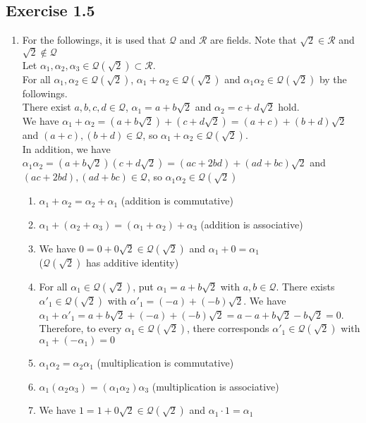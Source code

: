 \documentclass{article}
\newcommand\Q{\mathcal Q}
\newcommand\R{\mathcal R}
\begin{document}
\subsection{Exercise 1.5} 
\begin{enumerate}[label = (\alph*)]
\item
For the followings, it is used that $\Q$ and $\R$ are fields. Note that $\sqrt2 \in \R$ and $\sqrt2 \not\in \Q$\\
Let $\alpha_1, \alpha_2, \alpha_3 \in \Q(\sqrt2) \subset \R$.\\
For all $\alpha_1, \alpha_2 \in \Q(\sqrt2)$, $\alpha_1 + \alpha_2 \in \Q(\sqrt2)$ and $\alpha_1\alpha_2 \in \Q(\sqrt2)$ by the followings.\\
There exist $a,b,c,d \in \Q$, $\alpha_1 = a + b\sqrt2$ and $\alpha_2 = c + d\sqrt2$ hold.\\
We have $\alpha_1 + \alpha_2 = (a + b\sqrt2) + (c + d\sqrt2) = (a + c) + (b + d)\sqrt2$ and $(a + c),(b + d) \in \Q$, so $\alpha_1 + \alpha_2 \in \Q(\sqrt2)$.\\
In addition, we have $\alpha_1\alpha_2 = (a + b\sqrt2)(c + d\sqrt2) = (ac + 2bd) + (ad + bc)\sqrt2$ and $(ac + 2bd),(ad +bc) \in \Q$, so $\alpha_1\alpha_2 \in \Q(\sqrt2)$
\begin{enumerate}[label=\arabic*)]
\item $\alpha_1 + \alpha_2 = \alpha_2 + \alpha_1$ (addition is commutative)
\item $\alpha_1 + (\alpha_2 + \alpha_3) = (\alpha_1 + \alpha_2) + \alpha_3$ (addition is associative)
\item We have $0 = 0 + 0\sqrt2 \in \Q(\sqrt2)$ and $\alpha_1 + 0 = \alpha_1$\\($\Q(\sqrt2)$ has additive identity)
\item For all $\alpha_1 \in \Q(\sqrt2)$, put $\alpha_1 = a + b\sqrt2$ with $a,b \in \Q$.
There exists $\alpha'_1 \in \Q(\sqrt2)$ with $\alpha'_1 = (-a) + (-b)\sqrt2$. 
We have $\alpha_1 + \alpha'_1 = a + b\sqrt2 + (-a) + (- b)\sqrt2 = a - a + b\sqrt2 - b\sqrt2 = 0$. 
Therefore, to every $\alpha_1 \in \Q(\sqrt2)$, there corresponds $\alpha'_1 \in \Q(\sqrt2)$ with $\alpha_1 + (-\alpha_1) = 0$
\item $\alpha_1\alpha_2 = \alpha_2\alpha_1$ (multiplication is commutative)
\item $\alpha_1(\alpha_2\alpha_3) = (\alpha_1\alpha_2)\alpha_3$ (multiplication is associative)
\item We have $1 = 1 + 0 \sqrt2 \in \Q(\sqrt2)$ and $\alpha_1 \cdot 1 = \alpha_1$\\

\end{enumerate}
\end{enumerate}
\end{document}
